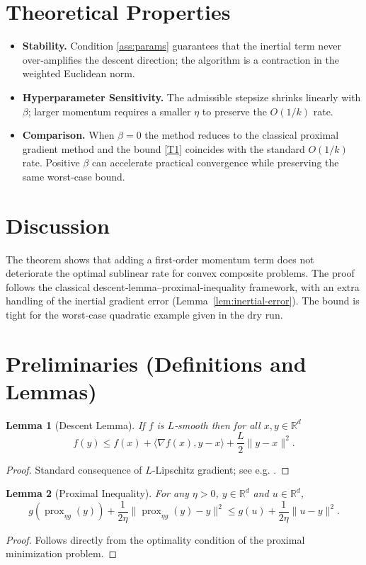 \documentclass{article}
\newtheorem{lemma}{Lemma}
\newcommand{\prox}{\operatorname{prox}}
\newcommand{\R}{\mathbb{R}}
\begin{document}
\section*{Theoretical Properties}
\begin{itemize}[leftmargin=*]
\item \textbf{Stability.} Condition \eqref{ass:params} guarantees that the inertial term never over‑amplifies the descent direction; the algorithm is a contraction in the weighted Euclidean norm.
\item \textbf{Hyperparameter Sensitivity.} The admissible stepsize shrinks linearly with $\beta$; larger momentum requires a smaller $\eta$ to preserve the $O(1/k)$ rate.
\item \textbf{Comparison.} When $\beta=0$ the method reduces to the classical proximal gradient method and the bound \eqref{T1} coincides with the standard $O(1/k)$ rate. Positive $\beta$ can accelerate practical convergence while preserving the same worst‑case bound.
\end{itemize}

\section*{Discussion}
The theorem shows that adding a first‑order momentum term does not deteriorate the optimal sublinear rate for convex composite problems. The proof follows the classical descent‑lemma–proximal‑inequality framework, with an extra handling of the inertial gradient error (Lemma~\ref{lem:inertial-error}). The bound is tight for the worst‑case quadratic example given in the dry run.

\newpage
\section*{Preliminaries (Definitions and Lemmas)}
\begin{lemma}[Descent Lemma]\label{lem:descent}
If $f$ is $L$‑smooth then for all $x,y\in\R^{d}$
\[
f(y)\le f(x)+\langle\nabla f(x),y-x\rangle+\frac{L}{2}\|y-x\|^{2}.
\tag{L1}
\]
\end{lemma}
\begin{proof}
Standard consequence of $L$‑Lipschitz gradient; see e.g. \cite{nesterov2004introductory}.
\end{proof}

\begin{lemma}[Proximal Inequality]\label{lem:prox}
For any $\eta>0$, $y\in\R^{d}$ and $u\in\R^{d}$,
\[
g(\prox_{\eta g}(y))+\frac{1}{2\eta}\bigl\|\prox_{\eta g}(y)-y\bigr\|^{2}
\le g(u)+\frac{1}{2\eta}\|u-y\|^{2}.
\tag{L2}
\]
\end{lemma}
\begin{proof}
Follows directly from the optimality condition of the proximal minimization problem.
\end{proof}
\end{document}
